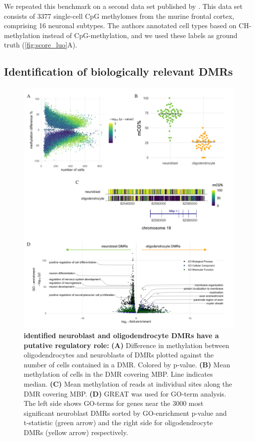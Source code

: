 \documentclass[twocolumn,10pt]{article}
\begin{document}
We repeated this benchmark on a second data set published by \citet{luo2017single}.
This data set consists of 3377 single-cell CpG methylomes from the murine frontal cortex, comprising 16 neuronal subtypes.
The authors annotated cell types based on CH-methylation instead of CpG-methylation, and we used these labels as ground truth (\ref{fig:score_luo}A).



\subsection{Identification of biologically relevant DMRs}

\begin{figure}[t]
    \begin{center}
        \includegraphics[width=.8\textwidth]{figures/Fig_DMRs.png}
    \end{center}
    \caption{\small \textbf{identified neuroblast and oligodendrocyte DMRs have a putative regulatory role:} \textbf{(A)} Difference in methylation between oligodendrocytes and neuroblasts of DMRs plotted against the number of cells contained in a DMR.
Colored by p-value.
\textbf{(B)} Mean methylation of cells in the DMR covering MBP.
Line indicates median.
\textbf{(C)} Mean methylation of reads at individual sites along the DMR covering MBP.
\textbf{(D)} GREAT \citet{mclean2010great} was used for GO-term analysis.
The left side shows GO-terms for genes near the 3000 most significant neuroblast DMRs sorted by GO-enrichment p-value and t-statistic (green arrow) and the right side for oligodendrocyte DMRs (yellow arrow) respectively.
    }
    \label{fig:dmr}
\end{figure}
\end{document}

